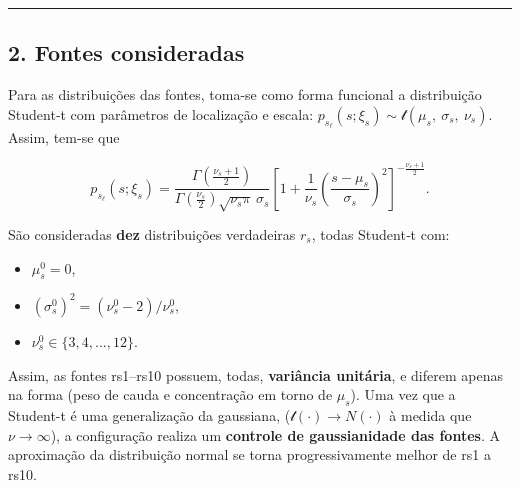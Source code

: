 \documentclass[11pt]{article}
\providecommand{\tightlist}{%
      \setlength{\itemsep}{0pt}\setlength{\parskip}{0pt}}
\begin{document}
\begin{center}\rule{0.5\linewidth}{0.5pt}\end{center}

\subsection{2. Fontes consideradas}\label{fontes-consideradas}

Para as distribuições das fontes, toma-se como forma funcional a
distribuição Student‑t com parâmetros de localização e escala:
\(p_{s_\ell}(s;\xi_s) \sim \mathcal{t}(\mu_s,\ \sigma_s,\ \nu_s)\).
Assim, tem-se que

\[p_{s_\ell}(s;\xi_s) = \frac{\Gamma\!\left(\frac{\nu_s+1}{2}\right)}{\Gamma\!\left(\frac{\nu_s}{2}\right)\sqrt{\nu_s\pi}\,\sigma_s}\left[1 + \frac{1}{\nu_s}\left(\frac{s-\mu_s}{\sigma_s}\right)^{2}\right]^{-\frac{\nu_s+1}{2}}.\]

São consideradas \textbf{dez} distribuições verdadeiras \(r_s\), todas
Student‑t com:

\begin{itemize}
\tightlist
\item
  \(\mu_s^{0} = 0\),
\item
  \((\sigma_s^{0})^2 = (\nu_s^{0}-2)/\nu_s^{0}\),
\item
  \(\nu_s^{0} \in \{3, 4, ..., 12 \}\).
\end{itemize}

Assim, as fontes rs1--rs10 possuem, todas, \textbf{variância unitária},
e diferem apenas na forma (peso de cauda e concentração em torno de
\(\mu_s\)). Uma vez que a Student-t é uma generalização da gaussiana,
(\(\mathcal{t}(\cdot) \rightarrow N(\cdot)\) à medida que
\(\nu \rightarrow \infty\)), a configuração realiza um \textbf{controle
de gaussianidade das fontes}. A aproximação da distribuição normal se
torna progressivamente melhor de rs1 a rs10.
\end{document}
